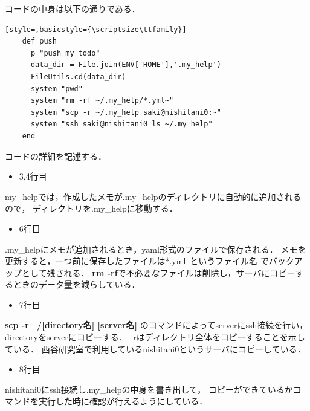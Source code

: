 コードの中身は以下の通りである．
\begin{lstlisting}[style=,basicstyle={\scriptsize\ttfamily}]
    def push
      p "push my_todo"
      data_dir = File.join(ENV['HOME'],'.my_help')
      FileUtils.cd(data_dir)
      system "pwd"
      system "rm -rf ~/.my_help/*.yml~"
      system "scp -r ~/.my_help saki@nishitani0:~"
      system "ssh saki@nishitani0 ls ~/.my_help" 
    end
\end{lstlisting}
コードの詳細を記述する．
\begin{itemize}
\item 3,4行目
\end{itemize}
\begin{description}
\item my\_helpでは，作成したメモが.my\_helpのディレクトリに自動的に追加されるので，
ディレクトリを.my\_helpに移動する．
\end{description}
\begin{itemize}
\item 6行目
\end{itemize}
\begin{description}
\item .my\_helpにメモが追加されるとき，yaml形式のファイルで保存される．
メモを更新すると，一つ前に保存したファイルは*.yml~というファイル名
でバックアップとして残される．
\textbf{rm -rf}で不必要なファイルは削除し，サーバにコピーするときのデータ量を減らしている．
\end{description}

\begin{itemize}
\item 7行目
\end{itemize}
\begin{description}
\item
\textbf{scp -r ~/[directory名] [server名]}
のコマンドによってserverにssh接続を行い，directoryをserverにコピーする．
-rはディレクトリ全体をコピーすることを示している．
西谷研究室で利用しているnishitani0というサーバにコピーしている．
\end{description}

\begin{itemize}
\item 8行目
\end{itemize}
\begin{description}
\item nishitani0にssh接続し.my\_helpの中身を書き出して，
コピーができているかコマンドを実行した時に確認が行えるようにしている．
\end{description}

